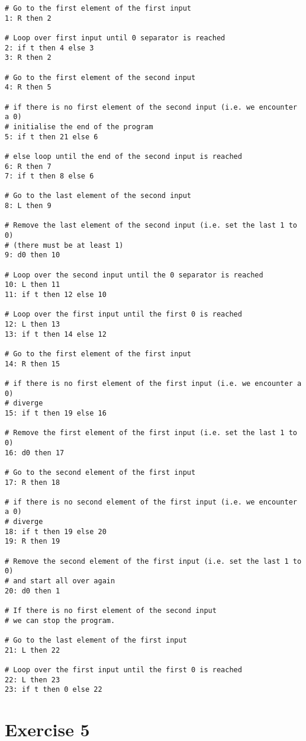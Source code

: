 \documentclass[11pt,a4paper]{article}
\begin{document}
\begin{lstlisting}[frame=single] 
# Go to the first element of the first input
1: R then 2 

# Loop over first input until 0 separator is reached
2: if t then 4 else 3
3: R then 2

# Go to the first element of the second input
4: R then 5

# if there is no first element of the second input (i.e. we encounter a 0) 
# initialise the end of the program
5: if t then 21 else 6

# else loop until the end of the second input is reached
6: R then 7
7: if t then 8 else 6

# Go to the last element of the second input
8: L then 9

# Remove the last element of the second input (i.e. set the last 1 to 0)
# (there must be at least 1)
9: d0 then 10

# Loop over the second input until the 0 separator is reached
10: L then 11
11: if t then 12 else 10

# Loop over the first input until the first 0 is reached
12: L then 13
13: if t then 14 else 12

# Go to the first element of the first input
14: R then 15

# if there is no first element of the first input (i.e. we encounter a 0) 
# diverge
15: if t then 19 else 16

# Remove the first element of the first input (i.e. set the last 1 to 0)
16: d0 then 17

# Go to the second element of the first input
17: R then 18

# if there is no second element of the first input (i.e. we encounter a 0) 
# diverge
18: if t then 19 else 20
19: R then 19

# Remove the second element of the first input (i.e. set the last 1 to 0)
# and start all over again
20: d0 then 1

# If there is no first element of the second input
# we can stop the program.

# Go to the last element of the first input
21: L then 22

# Loop over the first input until the first 0 is reached
22: L then 23
23: if t then 0 else 22

\end{lstlisting}



\section*{Exercise 5}
\end{document}
